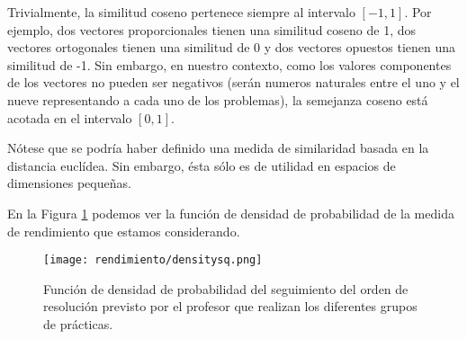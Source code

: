 Trivialmente, la similitud coseno pertenece siempre al intervalo $[-1,1]$. Por ejemplo, dos vectores proporcionales tienen una similitud coseno de 1, dos vectores ortogonales tienen una similitud de 0 y dos vectores opuestos tienen una similitud de -1. Sin embargo, en nuestro contexto, como los valores componentes de los vectores no pueden ser negativos (serán numeros naturales entre el uno y el nueve representando a cada uno de los problemas), la semejanza coseno está acotada en el intervalo $[0,1]$.

Nótese que se podría haber definido una medida de similaridad basada en la distancia euclídea. Sin embargo, ésta sólo es de utilidad en espacios de dimensiones pequeñas.

En la Figura \ref{fig:densityplotsq} podemos ver la función de densidad de probabilidad de la medida de rendimiento que estamos considerando.

\begin{figure}[H]
    \centering
    \texttt{[image: rendimiento/densitysq.png]}
    \caption{Función de densidad de probabilidad del seguimiento del orden de resolución previsto por el profesor que realizan los diferentes grupos de prácticas.}
    \label{fig:densityplotsq}
\end{figure}